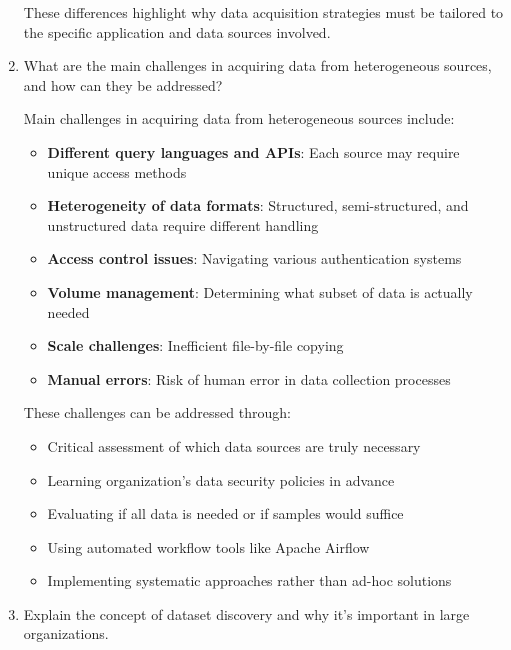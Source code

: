 \documentclass[12pt]{article}
\begin{document}
\begin{enumerate}
\begin{tcolorbox}[colback=blue!5!white,colframe=blue!75!black,title={Solution}]
    These differences highlight why data acquisition strategies must be tailored to the specific application and data sources involved.
    \end{tcolorbox}
    
    \item What are the main challenges in acquiring data from heterogeneous sources, and how can they be addressed?
    
    \begin{tcolorbox}[colback=blue!5!white,colframe=blue!75!black,title={Solution}]
    Main challenges in acquiring data from heterogeneous sources include:
    
    \begin{itemize}
        \item \textbf{Different query languages and APIs}: Each source may require unique access methods
        \item \textbf{Heterogeneity of data formats}: Structured, semi-structured, and unstructured data require different handling
        \item \textbf{Access control issues}: Navigating various authentication systems
        \item \textbf{Volume management}: Determining what subset of data is actually needed
        \item \textbf{Scale challenges}: Inefficient file-by-file copying
        \item \textbf{Manual errors}: Risk of human error in data collection processes
    \end{itemize}
    
    These challenges can be addressed through:
    
    \begin{itemize}
        \item Critical assessment of which data sources are truly necessary
        \item Learning organization's data security policies in advance
        \item Evaluating if all data is needed or if samples would suffice
        \item Using automated workflow tools like Apache Airflow
        \item Implementing systematic approaches rather than ad-hoc solutions
    \end{itemize}
    \end{tcolorbox}
    
    \item Explain the concept of dataset discovery and why it's important in large organizations.
    

\end{enumerate}
\end{document}
